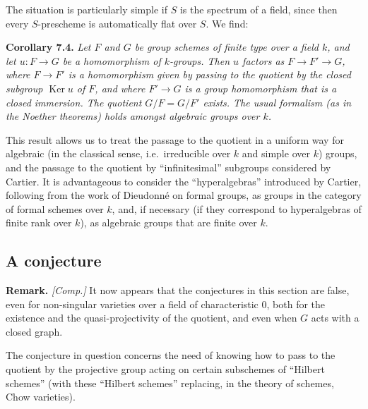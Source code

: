 \documentclass{article}
\newenvironment{itenv}[1]
  {\phantomsection\par\smallskip\noindent\textbf{#1.}\itshape}
  {\par\smallskip}
\newenvironment{rmenv}[1]
  {\phantomsection\par\smallskip\noindent\textbf{#1.}\rmfamily}
  {\par\smallskip}
\newcommand{\oldpage}[1]{\marginpar{\footnotesize$\Big\vert$ \textit{p.~#1}}}
\theoremstyle{definition}
\theoremstyle{definition}
\theoremstyle{definition}
\theoremstyle{definition}
\theoremstyle{remark}
\begin{document}
The situation is particularly simple if \(S\) is the spectrum of a field, since then every \(S\)-prescheme is automatically flat over \(S\).
We find:

\leavevmode{}%
\begin{itenv}{Corollary 7.4}
Let \(F\) and \(G\) be group schemes of finite type over a field \(k\), and let \(u\colon F\to G\) be a homomorphism of \(k\)-groups.
Then \(u\) factors as \(F\to F'\to G\), where \(F\to F'\) is a homomorphism given by passing to the quotient by the closed subgroup \(\operatorname{Ker}u\) of \(F\), and where \(F'\to G\) is a group homomorphism that is a closed immersion.
The quotient \(G/F=G/F'\) exists.
The usual formalism (as in the Noether theorems) holds amongst algebraic groups over \(k\).

\end{itenv}

This result allows us to treat the passage to the quotient in a uniform way for algebraic (in the classical sense, i.e.~irreducible over \(k\) and simple over \(k\)) groups, and the passage to the quotient by ``infinitesimal'' subgroups considered by Cartier.
\oldpage{212-18}It is advantageous to consider the ``hyperalgebras'' introduced by Cartier, following from the work of Dieudonné on formal groups, as groups in the category of formal schemes over \(k\), and, if necessary (if they correspond to hyperalgebras of finite rank over \(k\)), as algebraic groups that are finite over \(k\).

\hypertarget{fga-3-iii-section-8}{%
\subsection{A conjecture}\label{fga-3-iii-section-8}}

\begin{rmenv}{Remark}
\emph{{[}Comp.{]}}
It now appears that the conjectures in this section are false, even for non-singular varieties over a field of characteristic \(0\), both for the existence and the quasi-projectivity of the quotient, and even when \(G\) acts with a closed graph.

\end{rmenv}

The conjecture in question concerns the need of knowing how to pass to the quotient by the projective group acting on certain subschemes of ``Hilbert schemes'' (with these ``Hilbert schemes'' replacing, in the theory of schemes, Chow varieties).
\end{document}

